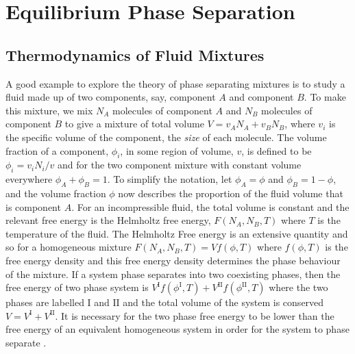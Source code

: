 \section{Equilibrium Phase Separation}

\subsection{Thermodynamics of Fluid Mixtures}

A good example to explore the theory of phase separating mixtures is to study a fluid made up of two components, say, component $A$ and component $B$. To make this mixture, we mix $N_A$ molecules of component $A$ and $N_B$ molecules of component $B$ to give a mixture of total volume $V = v_A N_A + v_B N_B$, where $v_i$ is the specific volume of the component, the \textit{size} of each molecule. The volume fraction of a component, $\phi_i$, in some region of volume, $v$, is defined to be $\phi_i = v_i N_i/v$ and for the two component mixture with constant volume everywhere $\phi_A+\phi_B = 1$. To simplify the notation, let $\phi_A=\phi$ and $\phi_B=1-\phi$, and the volume fraction $\phi$ now describes the proportion of the fluid volume that is component $A$. For an incompressible fluid, the total volume is constant and the relevant free energy is the Helmholtz free energy, $F(N_A, N_B, T)$ where $T$ is the temperature of the fluid. The Helmholtz Free energy is an extensive quantity and so for a homogeneous mixture $F(N_A, N_B, T) = V f(\phi, T)$ where $f(\phi, T)$ is the free energy density and this free energy density determines the phase behaviour of the mixture. If a system phase separates into two coexisting phases, then the free energy of two phase system is $V^{\mathrm{I}} f(\phi^{\mathrm{I}}, T)+ V^{\mathrm{II}} f(\phi^{\mathrm{II}}, T)$ where the two phases are labelled $\mathrm{I}$ and $\mathrm{II}$ and the total volume of the system is conserved $V = V^{\mathrm{I}}+V^{\mathrm{II}}$. It is necessary for the two phase free energy to be lower than the free energy of an equivalent homogeneous system in order for the system to phase separate \cite{jones2002soft}.

